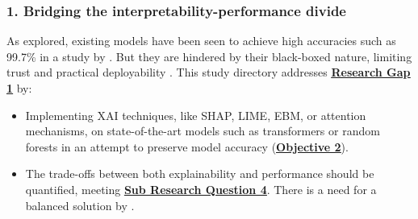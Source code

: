 
\subsubsection*{1. Bridging the interpretability-performance divide}
As explored, existing models have been seen to achieve high accuracies such as 99.7\% in a study by \cite{do2024integrated}. But they are hindered by their black-boxed nature, limiting trust and practical deployability \citep{atlam2022business}. This study directory addresses \hyperref[research-gap-1]{\uline{\textbf{Research Gap 1}}} by:

\begin{itemize}
  \item Implementing XAI techniques, like SHAP, LIME, EBM, or attention mechanisms, on state-of-the-art models such as transformers or random forests in an attempt to preserve model accuracy (\hyperref[objective-2]{\uline{\textbf{Objective 2}}}).
  \item The trade-offs between both explainability and performance should be quantified, meeting \hyperref[sub-research-q4]{\uline{\textbf{Sub Research Question 4}}}. There is a need for a balanced solution by \cite{alzahrani2024explainable}.
\end{itemize}

